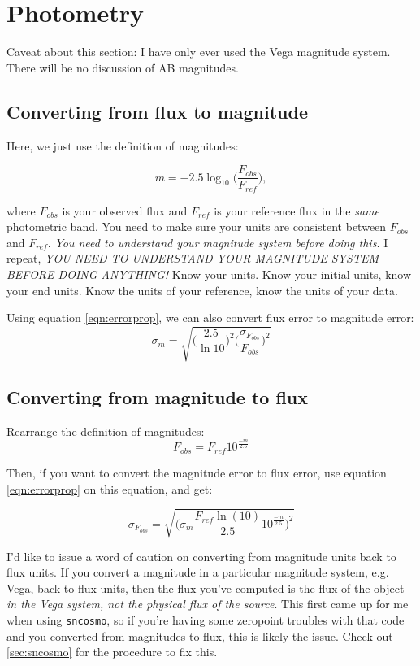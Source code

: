 \section{Photometry}
Caveat about this section: I have only ever used the Vega magnitude system. There will be no discussion of AB magnitudes. 

\subsection{Converting from flux to magnitude}
Here, we just use the definition of magnitudes:

\begin{equation}
    m = -2.5\log_{10} \Big( \frac{F_{obs}}{F_{ref}} \Big),
\end{equation}

where $F_{obs}$ is your observed flux and $F_{ref}$ is your reference flux in the \textit{same} photometric band. You need to make sure your units are consistent between $F_{obs}$ and $F_{ref}$. \textit{You need to understand your magnitude system before doing this.} I repeat, \textit{YOU NEED TO UNDERSTAND YOUR MAGNITUDE SYSTEM BEFORE DOING ANYTHING!} Know your units. Know your initial units, know your end units. Know the units of your reference, know the units of your data. 

Using equation \ref{eqn:errorprop}, we can also convert flux error to magnitude error:
\begin{equation}
    \label{eqn:flux-to-mag-err}
    \sigma_{m} = \sqrt{\Big( \frac{2.5}{\ln10} \Big)^{2} \Big( \frac{\sigma_{F_{obs}}}{F_{obs}}\Big)^{2}}
\end{equation}

\subsection{Converting from magnitude to flux}
\label{sec:magtoflux}
Rearrange the definition of magnitudes:
\begin{equation}
    F_{obs} = F_{ref}10^{\frac{-m}{2.5}}
\end{equation}

Then, if you want to convert the magnitude error to flux error, use equation \ref{eqn:errorprop} on this equation, and get: 

\begin{equation}
    \sigma_{F_{obs}} = \sqrt{\Big( \sigma_{m} \frac{F_{ref}\ln(10)}{2.5} 10^{\frac{-m}{2.5}} \Big)^{2}}
\end{equation}

I'd like to issue a word of caution on converting from magnitude units back to flux units. If you convert a magnitude in a particular magnitude system, e.g. Vega, back to flux units, then the flux you've computed is the flux of the object \textit{in the Vega system, not the physical flux of the source}. This first came up for me when using \texttt{sncosmo}, so if you're having some zeropoint troubles with that code and you converted from magnitudes to flux, this is likely the issue. Check out \ref{sec:sncosmo} for the procedure to fix this. 